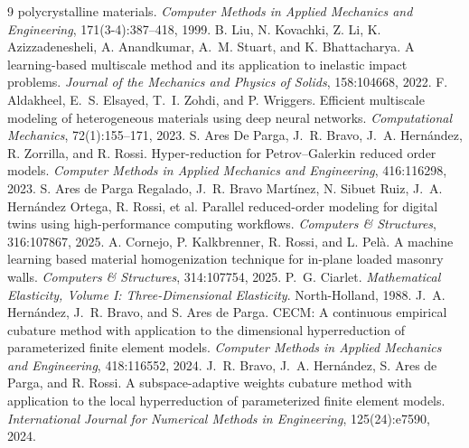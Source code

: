 \documentclass[10pt,a4paper]{article}
\begin{document}
\begin{thebibliography}{9}
polycrystalline materials. \emph{Computer Methods in Applied Mechanics
and Engineering}, 171(3-4):387--418, 1999.
B. Liu, N. Kovachki, Z. Li, K. Azizzadenesheli, A. Anandkumar, A.~M.
Stuart, and K. Bhattacharya. A learning-based multiscale method and its
application to inelastic impact problems. \emph{Journal of the
Mechanics and Physics of Solids}, 158:104668, 2022.
F. Aldakheel, E.~S. Elsayed, T.~I. Zohdi, and P. Wriggers. Efficient
multiscale modeling of heterogeneous materials using deep neural
networks. \emph{Computational Mechanics}, 72(1):155--171, 2023.
S. Ares De Parga, J.~R. Bravo, J.~A. Hern\'andez, R. Zorrilla, and
R. Rossi. Hyper-reduction for Petrov--Galerkin reduced order models.
\emph{Computer Methods in Applied Mechanics and Engineering},
416:116298, 2023.
S. Ares de Parga Regalado, J.~R. Bravo Mart\'inez, N. Sibuet Ruiz,
J.~A. Hern\'andez Ortega, R. Rossi, et al. Parallel reduced-order
modeling for digital twins using high-performance computing workflows.
\emph{Computers \& Structures}, 316:107867, 2025.
A. Cornejo, P. Kalkbrenner, R. Rossi, and L. Pel\`a. A machine learning
based material homogenization technique for in-plane loaded masonry
walls. \emph{Computers \& Structures}, 314:107754, 2025.
P.~G. Ciarlet. \emph{Mathematical Elasticity, Volume I: Three-Dimensional
Elasticity}. North-Holland, 1988.
J.~A. Hern\'andez, J.~R. Bravo, and S. Ares de Parga. CECM: A
continuous empirical cubature method with application to the
dimensional hyperreduction of parameterized finite element models.
\emph{Computer Methods in Applied Mechanics and Engineering},
418:116552, 2024.
J.~R. Bravo, J.~A. Hern\'andez, S. Ares de Parga, and R. Rossi. A
subspace-adaptive weights cubature method with application to the
local hyperreduction of parameterized finite element models.
\emph{International Journal for Numerical Methods in Engineering},
125(24):e7590, 2024.
\end{thebibliography}
\end{document}
